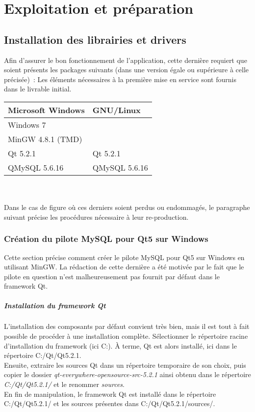 \chapter{Exploitation et préparation}

% 

\section{Installation des librairies et drivers}
Afin d'assurer le bon fonctionnement de l'application, cette dernière requiert que soient présents les packages suivants (dans une version égale ou supérieure à celle précisée)~:
Les éléments nécessaires à la première mise en service sont fournis dans le livrable initial.
\\

\begin{tabularx}{\linewidth}{X X}
	\toprule
	Microsoft Windows	& GNU/Linux		\\
	\midrule
	Windows 7			&				\\
	MinGW 4.8.1 (TMD)	&				\\
	Qt 5.2.1			& Qt 5.2.1		\\
	QMySQL 5.6.16		& QMySQL 5.6.16				\\
	\bottomrule
\end{tabularx}
\\
\\
Dans le cas de figure où ces derniers soient perdus ou endommagés, le paragraphe suivant précise les procédures nécessaire à leur re-production.

\subsection{Création du pilote MySQL pour Qt5 sur Windows}
Cette section précise comment créer le pilote MySQL pour Qt5 sur Windows en utilisant MinGW.
La rédaction de cette dernière a été motivée par le fait que le pilote en question n'est malheureusement pas fournit par défaut dans le framework Qt.


\paragraph{Installation du framework Qt}
L'installation des composants par défaut convient très bien, mais il est tout à fait possible de procéder à une installation complète. Sélectionner le répertoire racine d'installation du framework (ici C:). À terme, Qt est alors installé, ici dans le répertoire C:/Qt/Qt5.2.1.
\\
Ensuite, extraire les sources Qt dans un répertoire temporaire de son choix, puis copier le dossier \textit{qt-everywhere-opensource-src-5.2.1} ainsi obtenu dans le répertoire \textit{C:/Qt/Qt5.2.1/} et le renommer \textit{sources}.
\\
En fin de manipulation, le framework Qt est installé dans le répertoire C:/Qt/Qt5.2.1/ et les sources présentes dans C:/Qt/Qt5.2.1/sources/.

